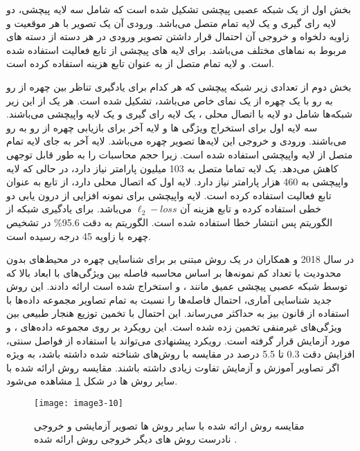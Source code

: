 \noindent
بخش اول از یک شبکه عصبی پیچشی تشکیل شده است که شامل سه لایه پیچشی، دو لایه رای گیری و یک لایه تمام متصل می‌باشد. ورودی آن یک تصویر با هر موقعیت و زاویه دلخواه و خروجی آن احتمال قرار داشتن تصویر ورودی در هر دسته از دسته های مربوط به نماهای مختلف می‌باشد. برای لایه های پیچشی از تابع فعالیت  استفاده شده است. و لایه تمام متصل از  به عنوان تابع هزینه استفاده کرده است.

\noindent
بخش دوم از تعدادی زیر شبکه پیچشی که هر کدام برای یادگیری تناظر بین چهره از رو به رو با یک چهره از یک نمای خاص می‌باشد، تشکیل شده است. هر یک از این زیر شبکه‌ها شامل دو لایه با اتصال محلی ، یک لایه رای گیری و یک لایه واپیچشی می‌باشند. سه لایه اول برای استخراج ویژگی ها و لایه آخر برای بازیابی چهره از رو به رو می‌باشند. ورودی و خروجی این لایه‌ها تصویر چهره می‌باشد. لایه آخر به جای لایه تمام متصل از لایه واپیچشی استفاده شده است. زیرا حجم محاسبات را به طور قابل توجهی کاهش می‌دهد. یک لایه تماما متصل به 103 میلیون پارامتر نیاز دارد، در حالی که لایه واپیچشی به 460 هزار پارامتر نیاز دارد. لایه اول که اتصال محلی دارد، از تابع  به عنوان تابع فعالیت استفاده کرده است. لایه واپیچشی برای نمونه افزایی از درون یابی دو خطی استفاده کرده و تابع هزینه آن $\ell_2-loss$ می‌باشد. برای یادگیری شبکه از الگوریتم پس انتشار خطا  استفاده شده است. الگوریتم  به دقت 95.6\% در تشخیص چهره با زاویه 45 درجه رسیده است.

\noindent
در سال 2018  و همکاران در \cite{SAVCHENKO2018170} یک روش مبتنی بر   برای شناسایی چهره در محیط‌های بدون محدودیت با تعداد کم نمونه‌ها بر اساس محاسبه فاصله بین ویژگی‌های با ابعاد بالا که توسط شبکه عصبی پیچشی عمیق مانند ،  و  استخراج شده است ارائه دادند. این روش جدید شناسایی آماری، احتمال فاصله‌ها را نسبت به تمام تصاویر مجموعه داده‌ها با استفاده از قانون بیز به حداکثر می‌رساند. این احتمال با تخمین توزیع هنجار طبیعی  بین ویژگی‌های غیرمنفی تخمین زده شده است. این رویکرد بر روی مجموعه داده‌های ،  و  مورد آزمایش قرار گرفته است. رویکرد پیشنهادی می‌تواند با استفاده از فواصل سنتی، افزایش دقت 0.3 تا 5.5 درصد در مقایسه با روش‌های شناخته شده داشته باشد، به ویژه اگر تصاویر آموزش و آزمایش تفاوت زیادی داشته باشند. مقایسه روش ارائه شده با سایر روش ها در شکل \ref{image3-10} مشاهده می‌شود.
 
\begin{figure}[h]
\centering
  \texttt{[image: image3-10]}
  \caption{
مقایسه روش ارائه شده با سایر روش ها  تصویر آزمایشی  و  خروجی نادرست روش های دیگر  خروجی روش ارائه شده \cite{SAVCHENKO2018170}.}
  \label{image3-10}
\end{figure}

